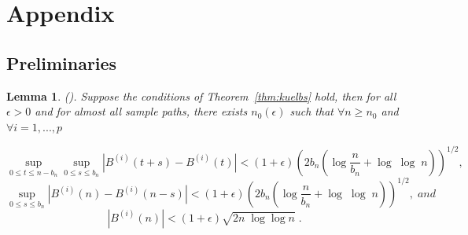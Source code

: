 \documentclass[11pt]{article}
\newtheorem{lemma}{Lemma}
\theoremstyle{remark}
\begin{document}
\section{Appendix}  \label{sec:appendix}
\subsection{Preliminaries} \label{apdx:preliminaries}

\begin{lemma}
\label{lemma: brownian}
(\cite{csorgo2014strong}). Suppose the conditions of Theorem~\ref{thm:kuelbs} hold, then for all $\epsilon > 0$ and for almost all sample paths, there exists $n_{0}\left(\epsilon\right)$ such that $\forall n\geq n_{0}$ and $\forall i = 1, ..., p$

\[
\sup_{0\leq t \leq n-b_n}\sup_{0 \leq s \leq b_n} \left| B^{\left(i\right)}\left(t+s\right) - B^{\left(i\right)}\left(t\right) \right| < \left(1+ \epsilon\right)\left(2b_n\left(\log\dfrac{n}{b_n} + \log\; \log\; n\right)\right)^{1/2} ,
\]
%
\[
\sup_{0 \leq s \leq b_n} \left|B^{\left(i\right)}\left(n\right) - B^{\left(i\right)}\left(n - s\right)\right| < \left(1+ \epsilon\right)\left(2b_n\left(\log\dfrac{n}{b_n} + \log\;\log\;n\right)\right)^{1/2} , \;and
\]
%
\[
\left|B^{\left(i\right)}\left(n\right)\right| < \left(1+\epsilon\right)\sqrt{2n\;\log \log n} \; . 
\]
\end{lemma}


\end{document}
